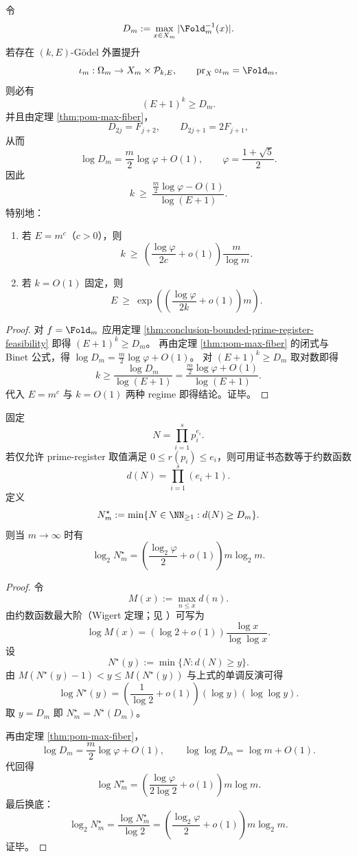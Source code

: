 \begin{theorem}\label{thm:conclusion-fold-prime-axis-exponent-lower-bound}
令
\[
D_m:=\max_{x\in X_m}|\Fold_m^{-1}(x)|.
\]
若存在 \((k,E)\)-Gödel 外置提升
\[
\iota_m:\Omega_m\to X_m\times\mathcal P_{k,E},
\qquad
\operatorname{pr}_X\circ\iota_m=\Fold_m,
\]
则必有
\[
(E+1)^k\ge D_m.
\]
并且由定理 \ref{thm:pom-max-fiber}，
\[
D_{2j}=F_{j+2},\qquad D_{2j+1}=2F_{j+1},
\]
从而
\[
\log D_m=\frac{m}{2}\log\varphi+O(1),\qquad \varphi=\frac{1+\sqrt5}{2}.
\]
因此
\[
k\ \ge\ \frac{\frac{m}{2}\log\varphi-O(1)}{\log(E+1)}.
\]
特别地：
\begin{enumerate}
  \item 若 \(E=m^c\)（\(c>0\)），则
  \[
  k\ \ge\ \left(\frac{\log\varphi}{2c}+o(1)\right)\frac{m}{\log m}.
  \]
  \item 若 \(k=O(1)\) 固定，则
  \[
  E\ \ge\ \exp\!\left(\left(\frac{\log\varphi}{2k}+o(1)\right)m\right).
  \]
\end{enumerate}
\end{theorem}
\begin{proof}
对 \(f=\Fold_m\) 应用定理 \ref{thm:conclusion-bounded-prime-register-feasibility} 即得 \((E+1)^k\ge D_m\)。
再由定理 \ref{thm:pom-max-fiber} 的闭式与 Binet 公式，得 \(\log D_m=\frac{m}{2}\log\varphi+O(1)\)。
对 \((E+1)^k\ge D_m\) 取对数即得
\[
k\ge \frac{\log D_m}{\log(E+1)}
=\frac{\frac{m}{2}\log\varphi+O(1)}{\log(E+1)}.
\]
代入 \(E=m^c\) 与 \(k=O(1)\) 两种 regime 即得结论。证毕。
\end{proof}

\begin{theorem}[约数格硬件证书库下的最优位长尺度]\label{thm:conclusion-divisor-lattice-optimal-bit-scaling}
固定
\[
N=\prod_{i=1}^{s}p_i^{e_i}.
\]
若仅允许 prime-register 取值满足 \(0\le r(p_i)\le e_i\)，则可用证书态数等于约数函数
\[
d(N)=\prod_{i=1}^{s}(e_i+1).
\]
定义
\[
N_m^\star:=\min\{N\in\NN_{\ge 1}: d(N)\ge D_m\}.
\]
则当 \(m\to\infty\) 时有
\[
\log_2 N_m^\star
=\left(\frac{\log_2\varphi}{2}+o(1)\right)m\log_2 m.
\]
\end{theorem}
\begin{proof}
令
\[
M(x):=\max_{n\le x}d(n).
\]
由约数函数最大阶（Wigert 定理；见 \cite[Ch.~13]{Apostol1976}）可写为
\[
\log M(x)=\left(\log2+o(1)\right)\frac{\log x}{\log\log x}.
\]
设
\[
N^\star(y):=\min\{N:d(N)\ge y\}.
\]
由 \(M(N^\star(y)-1)<y\le M(N^\star(y))\) 与上式的单调反演可得
\[
\log N^\star(y)
=\left(\frac{1}{\log2}+o(1)\right)(\log y)(\log\log y).
\]
取 \(y=D_m\) 即 \(N_m^\star=N^\star(D_m)\)。

再由定理 \ref{thm:pom-max-fiber}，
\[
\log D_m=\frac{m}{2}\log\varphi+O(1),\qquad
\log\log D_m=\log m+O(1).
\]
代回得
\[
\log N_m^\star
=\left(\frac{\log\varphi}{2\log2}+o(1)\right)m\log m.
\]
最后换底：
\[
\log_2 N_m^\star
=\frac{\log N_m^\star}{\log2}
=\left(\frac{\log_2\varphi}{2}+o(1)\right)m\log_2 m.
\]
证毕。
\end{proof}

\endinput


